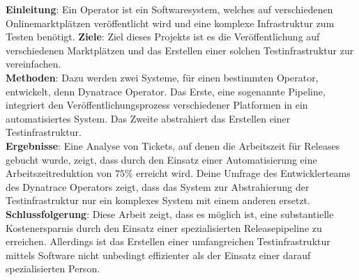 \textbf{Einleitung}:
Ein Operator ist ein Softwaresystem, welches auf verschiedenen Onlinemarktplätzen veröffentlicht wird und eine komplexe Infrastruktur zum Testen benötigt.
\textbf{Ziele}:
Ziel dieses Projekts ist es die Veröffentlichung auf verschiedenen Marktplätzen und das Erstellen einer solchen Testinfrastruktur zur vereinfachen.\\
\textbf{Methoden}:
Dazu werden zwei Systeme, für einen bestimmten Operator, entwickelt, denn Dynatrace Operator.
Das Erste, eine sogenannte Pipeline, integriert den Veröffentlichungsprozess verschiedener Platformen in ein automatisiertes System.
Das Zweite abstrahiert das Erstellen einer Testinfrastruktur. \\
\textbf{Ergebnisse}:
Eine Analyse von Tickets, auf denen die Arbeitszeit für Releases gebucht wurde, zeigt, dass durch den Einsatz einer Automatisierung eine Arbeitszeitreduktion von $75 \%$ erreicht wird.
Deine Umfrage des Entwicklerteams des Dynatrace Operators zeigt, dass das System zur Abstrahierung der Testinfrastruktur nur ein komplexes System mit einem anderen ersetzt. \\
\textbf{Schlussfolgerung}:
Diese Arbeit zeigt, dass es möglich ist, eine substantielle Kostenersparnis durch den Einsatz einer spezialisierten Releasepipeline zu erreichen.
Allerdings ist das Erstellen einer umfangreichen Testinfrastruktur mittels Software nicht unbedingt effizienter als der Einsatz einer darauf spezialisierten Person.
